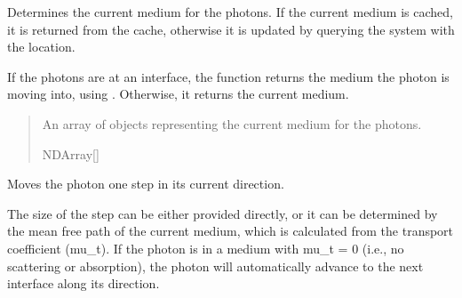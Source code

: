 \documentclass[letterpaper,10pt,english]{sphinxmanual}
\begin{document}
\begin{fulllineitems}
\begin{fulllineitems}
\label{\detokenize{generated/photon_canon.optics:photon_canon.optics.Photon.medium}}
\pysigstartsignatures
\pysigline
{}
\pysigstopsignatures
\sphinxAtStartPar
Determines the current medium for the photons. If the current medium is cached, it is returned from the cache,
otherwise it is updated by querying the system with the location.

\sphinxAtStartPar
If the photons are at an interface, the function returns the medium the photon is moving into,
using . Otherwise, it returns the current medium.
\begin{quote}\begin{description}
\sphinxAtStartPar
An array of  objects representing the current medium for the photons.

\sphinxAtStartPar
NDArray{[}{\hyperref[\detokenize{generated/photon_canon.optics:photon_canon.optics.Medium}]{}}{]}

\end{description}\end{quote}

\end{fulllineitems}


\begin{fulllineitems}
\label{\detokenize{generated/photon_canon.optics:photon_canon.optics.Photon.move}}
\pysigstartsignatures
\pysiglinewithargsret
{}
{}
{}
\pysigstopsignatures
\sphinxAtStartPar
Moves the photon one step in its current direction.

\sphinxAtStartPar
The size of the step can be either provided directly, or it can be determined by the mean free path of the
current medium, which is calculated from the transport coefficient (mu\_t). If the photon is in a medium with
mu\_t = 0 (i.e., no scattering or absorption), the photon will automatically advance to the next interface along
its direction.


\end{fulllineitems}
\end{fulllineitems}
\end{document}
